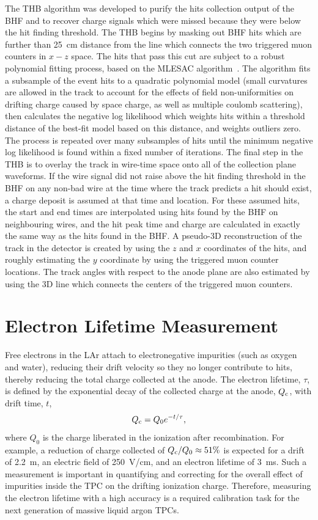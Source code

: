 \documentclass[10pt,a4paper]{article}
\begin{document}
The THB algorithm was developed to purify the hits collection output of the BHF and to recover charge signals which were missed because they were below the hit finding threshold. The THB begins by masking out BHF hits which are further than 25~cm distance from the line which connects the two triggered muon counters in $x-z$ space. The hits that pass this cut are subject to a robust polynomial fitting process, based on the MLESAC algorithm~\cite{MLESAC}. The algorithm fits a subsample of the event hits to a quadratic polynomial model (small curvatures are allowed in the track to account for the effects of field non-uniformities on drifting charge caused by space charge, as well as multiple coulomb scattering), then calculates the negative log likelihood which weights hits within a threshold distance of the best-fit model based on this distance, and weights outliers zero. The process is repeated over many subsamples of hits until the minimum negative log likelihood is found within a fixed number of iterations. The final step in the THB is to overlay the track in wire-time space onto all of the collection plane waveforms. If the wire signal did not raise above the hit finding threshold in the BHF on any non-bad wire at the time where the track predicts a hit should exist, a charge deposit is assumed at that time and location. For these assumed hits, the start and end times are interpolated using hits found by the BHF on neighbouring wires, and the hit peak time and charge are calculated in exactly the same way as the hits found in the BHF. A pseudo-3D reconstruction of the track in the detector is created by using the $z$ and $x$ coordinates of the hits, and roughly estimating the $y$ coordinate by using the triggered muon counter locations. The track angles with respect to the anode plane are also estimated by using the 3D line which connects the centers of the triggered muon counters.

\section{Electron Lifetime Measurement}\label{sec:lifetime}

Free electrons in the LAr attach to electronegative impurities (such as oxygen and water), reducing their drift velocity so they no longer contribute to hits, thereby reducing the total charge collected at the anode. The electron lifetime, $\tau$, is defined by the exponential decay of the collected charge at the anode, $Q_{\rm{c}}$, with drift time, $t$, 
\begin{equation}\label{eq:lifetime}
Q_{\rm{c}} = Q_{0} e^{-t/\tau},
\end{equation}
where $Q_{0}$ is the charge liberated in the ionization after recombination. For example, a reduction of charge collected of $Q_{\rm{c}}/Q_{0}\approx 51\%$ is expected for a drift of 2.2~m, an electric field of 250~V$\!$/cm, and an electron lifetime of 3~ms. Such a measurement is important in quantifying and correcting for the overall effect of impurities inside the TPC on the drifting ionization charge. Therefore, measuring the electron lifetime with a high accuracy is a required calibration task for the next generation of massive liquid argon TPCs.
\end{document}
